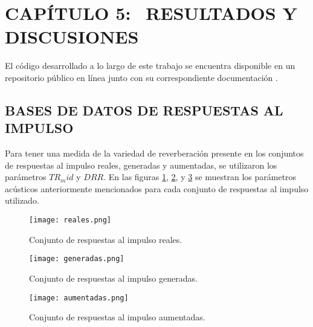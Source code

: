 \section[Resultados y Discusiones]{CAPÍTULO 5:$\ \ \ \ $RESULTADOS Y DISCUSIONES} 
El código desarrollado a lo largo de este trabajo se encuentra disponible en un repositorio público en línea junto con su correspondiente documentación \cite{repo}.

\subsection[Bases de datos de respuestas al impulso]{BASES DE DATOS DE RESPUESTAS AL IMPULSO}

Para tener una medida de la variedad de reverberación presente en los conjuntos de respuestas al impulso reales, generadas y aumentadas, se utilizaron los parámetros $TR_mid$ y $DRR$. En las figuras \ref{fig:cloud_reales}, \ref{fig:cloud_generadas}, y \ref{fig:cloud_aumentadas} se muestran los parámetros acústicos anteriormente mencionados para cada conjunto de respuestas al impulso utilizado.  

\begin{figure}[H]
	\centering{}
	\texttt{[image: reales.png]}
	\caption{Conjunto de respuestas al impulso reales.}
	\label{fig:cloud_reales}
\end{figure}

\begin{figure}[H]
	\centering{}
	\texttt{[image: generadas.png]}
	\caption{Conjunto de respuestas al impulso generadas.}
	\label{fig:cloud_generadas}
\end{figure}

\begin{figure}[H]
	\centering{}
	\texttt{[image: aumentadas.png]}
	\caption{Conjunto de respuestas al impulso aumentadas.}
	\label{fig:cloud_aumentadas}
\end{figure}

